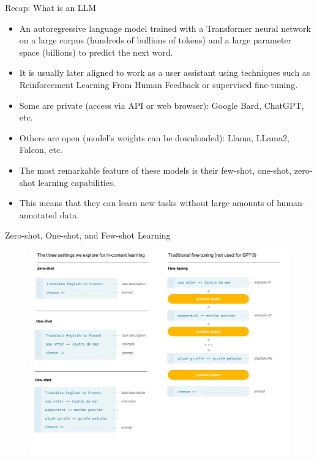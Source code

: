 \documentclass[handout]{beamer}
\begin{document}
\begin{frame}{Recap: What is an LLM}
\begin{scriptsize}
\begin{itemize}
\item  An autoregressive language model trained with a Transformer neural network on a large corpus (hundreds of bullions of tokens) and a large parameter space (billions) to predict the next word.
\item It is usually later aligned to work as a user assistant using techniques such as Reinforcement Learning From Human Feedback  \cite{ouyang2022training} or supervised fine-tuning.
\item Some are private (access via API or web browser): Google Bard, ChatGPT, etc.
\item Others are open (model's weights can be downloaded): Llama, LLama2, Falcon, etc.
\item The most remarkable feature of these models is their few-shot, one-shot, zero-shot learning capabilities.
\item This means that they can learn new tasks without large amounts of human-annotated data.
\end{itemize}
\end{scriptsize}
\end{frame}

\begin{frame}{Zero-shot, One-shot, and Few-shot Learning}


 \begin{figure}[h]
        	\includegraphics[scale = 0.18]{pics/zeroonefew.png}
        \end{figure}  



\end{frame}
\end{document}
